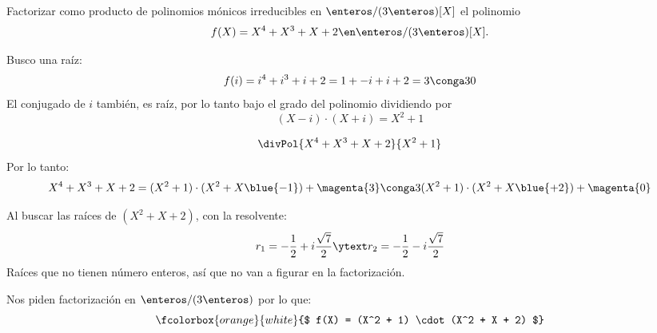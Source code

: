 \begin{enunciado}{\ejExtra}
	Factorizar como producto de polinomios mónicos irreducibles en $\enteros/(3\enteros)[X]$ el polinomio
	$$
		f(X) = X^4 + X^3 + X + 2 \en \enteros / (3 \enteros)[X].
	$$
\end{enunciado}

Busco una raíz:
$$
	f(i) = i^4 + i^3 + i + 2 = 1 + -i + i + 2 = 3 \conga3 0
$$
El conjugado de $i$ también, es raíz, por lo tanto bajo el grado del polinomio dividiendo por
$$
	(X - i) \cdot (X + i) = X^2 + 1
$$

$$
	\divPol{X^4 + X^3 + X + 2}{X^2 + 1}
$$
Por lo tanto:
$$
	X^4 + X^3 + X + 2 =
	(X^2 + 1) \cdot (X^2 + X \blue{- 1}) + \magenta{3}
	\conga3
	(X^2 + 1) \cdot (X^2 + X \blue{+ 2}) + \magenta{0}
$$

Al buscar las raíces de $(X^2 + X + 2)$, con la resolvente:
$$
	r_1 = -\frac{1}{2} + i \frac{\sqrt{7}}{2}
	\ytext
	r_2 = -\frac{1}{2} - i \frac{\sqrt{7}}{2}
$$
Raíces que no tienen número enteros, así que no van a figurar en la factorización.

Nos piden factorización en $\enteros/(3\enteros)$ por lo que:
$$
	\fcolorbox{orange}{white}{$
			f(X) = (X^2 + 1) \cdot (X^2 + X + 2)
		$}
$$

\begin{aportes}
  \item {}
\end{aportes}
